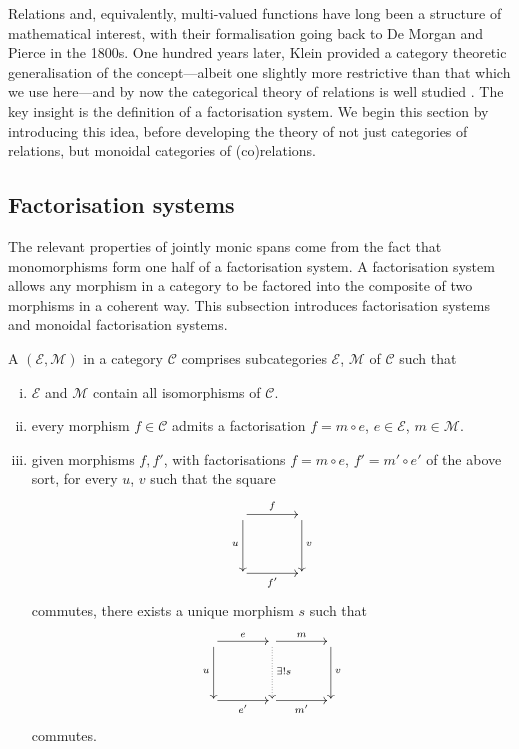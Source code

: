 Relations and, equivalently, multi-valued functions have long been a structure
of mathematical interest, with their formalisation going back to De Morgan
\cite{DeM60} and Pierce \cite{Pie70} in the 1800s. One hundred years later,
Klein \cite{Kle70} provided a category theoretic generalisation of the
concept---albeit one slightly more restrictive than that which we use here---and
by now the categorical theory of relations is well studied \cite{Mil00, JW00}.
The key insight is the definition of a factorisation system. We begin this section
by introducing this idea, before developing the theory of not just categories
of relations, but monoidal categories of (co)relations.

\subsection{Factorisation systems}
The relevant properties of jointly monic spans come from the fact that
monomorphisms form one half of a factorisation system. A factorisation system
allows any morphism in a category to be factored into the composite of two
morphisms in a coherent way. This subsection introduces factorisation systems
and monoidal factorisation systems.

\begin{definition}
  A  $(\mathcal E,\mathcal M)$ in a category
  $\mathcal C$ comprises subcategories $\mathcal E$, $\mathcal M$ of $\mathcal
  C$ such that
  \begin{enumerate}[(i)]
    \item $\mathcal E$ and $\mathcal M$ contain all isomorphisms of $\mathcal
      C$.
    \item  every morphism $f \in \mathcal C$ admits a factorisation $f=m \circ
      e$, $e \in \mathcal E$, $m \in \mathcal M$.
\item given morphisms $f,f'$, with factorisations $f = m \circ e$, $f' = m' \circ
  e'$ of the above sort, for every $u$, $v$ such that the square
  \[
    \xymatrixcolsep{3pc}
    \xymatrixrowsep{3pc}
    \xymatrix{
       \ar[r]^f \ar[d]_u &  \ar[d]^v \\
       \ar[r]_{f'} & 
    }
  \]
  commutes, there exists a unique morphism $s$ such that
  \[
    \xymatrixcolsep{3pc}
    \xymatrixrowsep{3pc}
    \xymatrix{
      \ar[r]^e \ar[d]_u & \ar[r]^m \ar@{.>}[d]^{\exists! s} &  \ar[d]^v \\
       \ar[r]_{e'}& \ar[r]_{m'} & 
    }
  \]
  commutes.
  \end{enumerate}
\end{definition}

